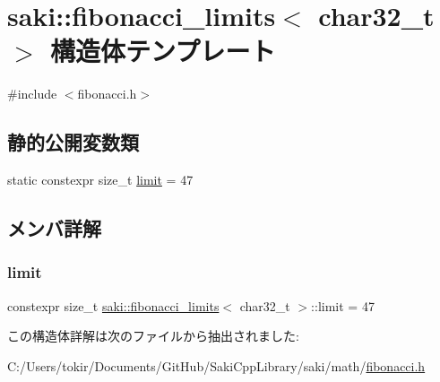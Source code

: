 \hypertarget{structsaki_1_1fibonacci__limits_3_01char32__t_01_4}{}\section{saki\+:\+:fibonacci\+\_\+limits$<$ char32\+\_\+t $>$ 構造体テンプレート}
\label{structsaki_1_1fibonacci__limits_3_01char32__t_01_4}


{\ttfamily \#include $<$fibonacci.\+h$>$}

\subsection*{静的公開変数類}
\begin{DoxyCompactItemize}
\item 
static constexpr size\+\_\+t \mbox{\hyperlink{structsaki_1_1fibonacci__limits_3_01char32__t_01_4_a21c6f01e28ab37080347cc2400078aa4}{limit}} = 47
\end{DoxyCompactItemize}


\subsection{メンバ詳解}
\mbox{\label{structsaki_1_1fibonacci__limits_3_01char32__t_01_4_a21c6f01e28ab37080347cc2400078aa4}} 
\subsubsection{\texorpdfstring{limit}{limit}}
{\footnotesize\ttfamily constexpr size\+\_\+t \mbox{\hyperlink{structsaki_1_1fibonacci__limits}{saki\+::fibonacci\+\_\+limits}}$<$ char32\+\_\+t $>$\+::limit = 47\hspace{0.3cm}{\ttfamily [static]}}



この構造体詳解は次のファイルから抽出されました\+:\begin{DoxyCompactItemize}
\item 
C\+:/\+Users/tokir/\+Documents/\+Git\+Hub/\+Saki\+Cpp\+Library/saki/math/\mbox{\hyperlink{fibonacci_8h}{fibonacci.\+h}}\end{DoxyCompactItemize}
